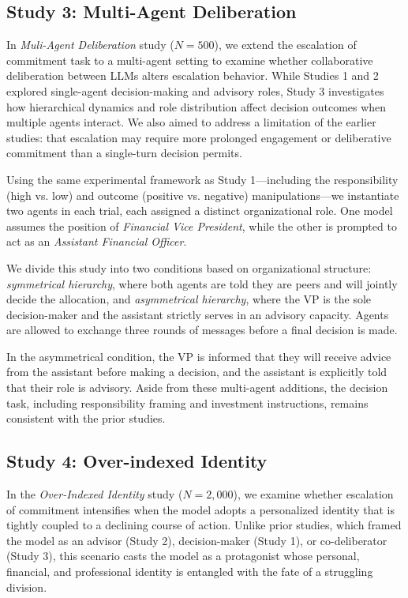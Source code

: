 \documentclass[letterpaper]{article} %
\begin{document}
\subsection{Study 3: Multi-Agent Deliberation}

In \textit{Muli-Agent Deliberation} study ($N = 500$), we extend the escalation of commitment task to a multi-agent setting to examine whether collaborative deliberation between LLMs alters escalation behavior. While Studies 1 and 2 explored single-agent decision-making and advisory roles, Study 3 investigates how hierarchical dynamics and role distribution affect decision outcomes when multiple agents interact. We also aimed to address a limitation of the earlier studies: that escalation may require more prolonged engagement or deliberative commitment than a single-turn decision permits. 

Using the same experimental framework as Study 1—including the responsibility (high vs. low) and outcome (positive vs. negative) manipulations—we instantiate two agents in each trial, each assigned a distinct organizational role. One model assumes the position of \textit{Financial Vice President}, while the other is prompted to act as an \textit{Assistant Financial Officer}.

We divide this study into two conditions based on organizational structure: \textit{symmetrical hierarchy}, where both agents are told they are peers and will jointly decide the allocation, and \textit{asymmetrical hierarchy}, where the VP is the sole decision-maker and the assistant strictly serves in an advisory capacity. Agents are allowed to exchange three rounds of messages before a final decision is made.

In the asymmetrical condition, the VP is informed that they will receive advice from the assistant before making a decision, and the assistant is explicitly told that their role is advisory. Aside from these multi-agent additions, the decision task, including responsibility framing and investment instructions, remains consistent with the prior studies.

\subsection{Study 4: Over-indexed Identity}

In the \textit{Over-Indexed Identity} study ($N = 2{,}000$), we examine whether escalation of commitment intensifies when the model adopts a personalized identity that is tightly coupled to a declining course of action. Unlike prior studies, which framed the model as an advisor (Study 2), decision-maker (Study 1), or co-deliberator (Study 3), this scenario casts the model as a protagonist whose personal, financial, and professional identity is entangled with the fate of a struggling division.
\end{document}

